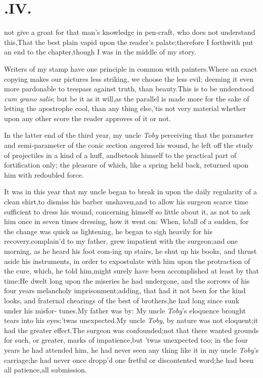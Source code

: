 \documentclass{article}
\begin{document}
\section{.\enspace  IV.}

 not give a groat for that
man’s knowledge in pen-craft, who does not\break 
understand this,\tsk That the best plain
vapid upon the reader’s palate;\tsk there\-fore I forthwith put an end to the
chapter,\tsk though I was in the middle of my story.

\tsh Writers of my stamp have one principle in common
with painters.\tsk\break Where an exact copying makes our pictures less
striking, we choose the less evil; deeming it even more pardonable
to trespass against truth, than beauty.\tsk\break This is to be understood
\textit{cum grano salis}; but be it as it will,\tsk as the parallel
is made more for the sake of letting the apostrophe cool, than any
thing else,\tsk\break ’tis not very material whether upon any
other score the reader approves of it or not.

In the latter end of the third year, my uncle \textit{Toby}
perceiving that the parameter and semi-parameter of the conic
section angered his wound, he left off the study of projectiles in
a kind of a huff, and\break betook himself to the practical part of
fortification only; the pleasure of which, like a spring held back,
returned upon him with redoubled force.

It was in this year that my uncle began to break in upon the daily regularity of a clean
shirt,\tsh to dismiss his barber
unshaven,\tsh and to allow his surgeon
scarce time
sufficient to dress his wound, concerning himself so little about
it, as not to ask him once in seven times dressing, how it went on:
When, lo!\tsk all of a sudden, for the change was quick as
lightening, he began to sigh heavily for his
recovery,\tsk complain’d to my father, grew impatient with
the surgeon;\tsk and one morning, as he heard his foot
com-\break ing up stairs, he shut up his books, and thrust aside his
instruments, in order to expostulate with him upon the protraction
of the cure, which, he told him,\break might surely have been
accomplished at least by that time:\tsk He dwelt long upon the
miseries he had undergone, and the sorrows of his four years
melancholy\break
imprisonment;\tsk adding, that had it not been
for the kind looks, and fraternal chearings of the best of
brothers,\tsk he had long since sunk under his
misfor- tunes.\tsk My father was by: My uncle
\textit{Toby}’s eloquence brought tears into his eyes;\tsh ’twas
unexpected.\tsh My uncle \textit{Toby}, by nature was not
eloquent;\tsk\break it had the greater effect.\tsk The surgeon
was confounded;\tsk not that there wanted grounds for
such, or greater, marks of impatience,\tsk but ’twas
unexpected too; in the four years he had attended him, he had never
seen any thing like it in my uncle \textit{Toby}’s carriage;\tsk he
had never once dropp’d one fretful or discontented
word;\tsk he had been all patience,\tsk all
submission.
\end{document}
